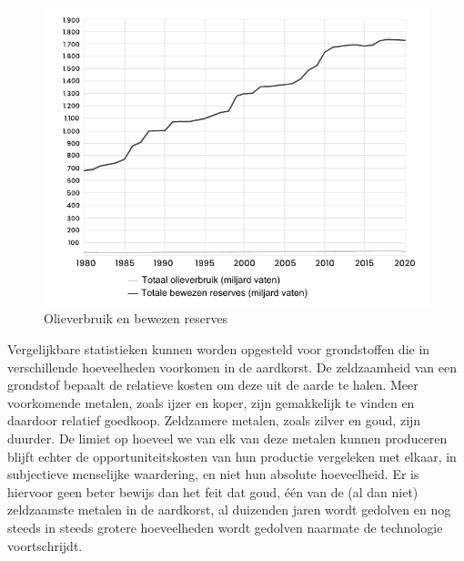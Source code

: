 \begin{figure}[!htb]
\centering
    \includegraphics[width=\textwidth]{figures/fig5.pdf}
\caption[Olieverbruik en bewezen reserves]{Olieverbruik en bewezen reserves\footnotemark}
\label{fig5}
\end{figure}

Vergelijkbare statistieken kunnen worden opgesteld voor grondstoffen die
in verschillende hoeveelheden voorkomen in de aardkorst. De zeldzaamheid
van een grondstof bepaalt de relatieve kosten om deze uit de aarde te
halen. Meer voorkomende metalen, zoals ijzer en koper, zijn gemakkelijk
te vinden en daardoor relatief goedkoop. Zeldzamere metalen, zoals
zilver en goud, zijn duurder. De limiet op hoeveel we van elk van deze
metalen kunnen produceren blijft echter de opportuniteitskosten van hun
productie vergeleken met elkaar, in subjectieve menselijke waardering,
en niet hun absolute hoeveelheid. Er is hiervoor geen beter bewijs dan
het feit dat goud, één van de (al dan niet) zeldzaamste metalen in de
aardkorst, al duizenden jaren wordt gedolven en nog steeds in steeds
grotere hoeveelheden wordt gedolven naarmate de technologie
voortschrijdt.

